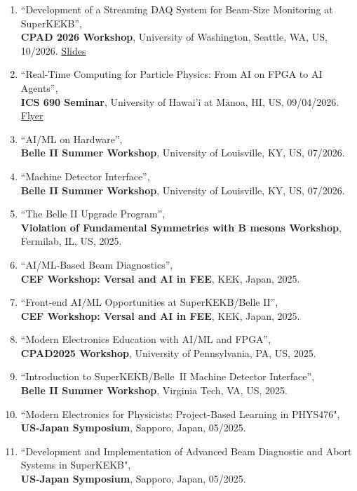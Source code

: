 \documentclass[11pt]{article}
\renewcommand{\labelenumi}{[\arabic{enumi}]}
\begin{document}
{\footnotesize
\begin{enumerate}[itemsep=0pt]
\renewcommand{\labelenumi}{[\arabic{enumi}]} 
\item {``Development of a Streaming DAQ System for Beam-Size Monitoring at SuperKEKB'',\\
\textbf{CPAD 2026 Workshop}, University of Washington, Seattle, WA, US, 10/2026. \href{https://indico.global/event/17230/contributions/169984/attachments/77776/151455/SiXRM_CPAD2026_KY.pdf}{Slides}}
\item {``Real-Time Computing for Particle Physics: From AI on FPGA to AI Agents'',\\
\textbf{ICS 690 Seminar}, University of Hawai'i at M$\bar{\text{a}}$noa, HI, US, 09/04/2026. \href{https://sykeisuke.github.io/documents/ICS690_Seminar_Flyer_20260904.pdf}{Flyer}}
\item {``AI/ML on Hardware'',\\
\textbf{Belle II Summer Workshop}, University of Louisville, KY, US, 07/2026.}
\item {``Machine Detector Interface'',\\
\textbf{Belle II Summer Workshop}, University of Louisville, KY, US, 07/2026.}
\item {``The Belle II Upgrade Program'',\\
\textbf{Violation of Fundamental Symmetries with B mesons Workshop}, Fermilab, IL, US, 2025.}
\item {``AI/ML-Based Beam Diagnostics'',\\
\textbf{CEF Workshop: Versal and AI in FEE}, KEK, Japan, 2025.}
\item {``Front-end AI/ML Opportunities at SuperKEKB/Belle II'',\\
\textbf{CEF Workshop: Versal and AI in FEE}, KEK, Japan, 2025.}
\item {``Modern Electronics Education with AI/ML and FPGA'',\\
\textbf{CPAD2025 Workshop}, University of Pennsylvania, PA, US, 2025.}
\item {``Introduction to SuperKEKB/Belle~II Machine Detector Interface'',\\
\textbf{Belle II Summer Workshop}, Virginia Tech, VA, US, 2025.}
\item {``Modern Electronics for Physicists: Project-Based Learning in PHYS476",\\ \textbf{US-Japan Symposium}, Sapporo, Japan, 05/2025.} 
\item {``Development and Implementation of Advanced Beam Diagnostic and Abort Systems in SuperKEKB",\\ \textbf{US-Japan Symposium}, Sapporo, Japan, 05/2025.} 

\end{enumerate}}
\end{document}
